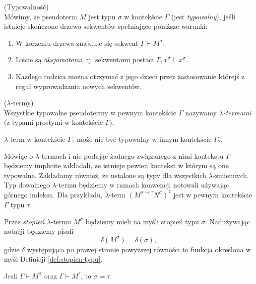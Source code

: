 \begin{definicja}(Typowalność)\\
  Mówimy, że pseudoterm \(M\) jest typu \(\sigma\) w kontekście \(\Gamma\) (jest \emph{typowalny}), jeśli istnieje skończone drzewo sekwentów spełniające poniższe warunki:
  \begin{enumerate}
      \item W korzeniu drzewa znajduje się sekwent \(\Gamma \vdash M^\sigma\).
      \item Liście są \emph{aksjomatami}, tj. sekwentami postaci \(\Gamma, x^\sigma \vdash x^\sigma\).
      \item Każdego rodzica można otrzymać z jego dzieci przez zastosowanie którejś z reguł wyprowadzania nowych sekwentów.
  \end{enumerate}
\end{definicja}
 \begin{definicja}\label{def:lambda-term}(\(\lambda\)-termy)\\ 
   Wszystkie typowalne pseudotermy w pewnym kontekście \(\Gamma\) nazywamy \emph{\(\lambda\)-termami} (z typami prostymi w  kontekście \(\Gamma\)).
  \begin{uwaga*}
    \(\lambda\)-term w kontekście \(\Gamma_1\) może nie być typowalny w innym kontekście \(\Gamma_2\).   
  \end{uwaga*}
\end{definicja}
Mówiąc o \(\lambda\)-termach i nie podając żadnego związanego z nimi kontekstu \(\Gamma\) będziemy implicite zakładali, że istnieje pewien kontekst w którym są one typowalne. Zakładamy również, że ustalone są typy dla wszystkich \(\lambda\)-zmiennych. Typ dowolnego \(\lambda\)-termu będziemy w ramach konwencji notowali używając górnego indeksu. Dla przykładu, \(\lambda\)-term \(\left(M^{\sigma\to\tau}N^\sigma\right)^\tau\) jest w pewnym kontekście \(\Gamma\) typu \(\tau\). 

   Przez \emph{stopień} \(\lambda\)-termu \(M^\sigma\) będziemy mieli na myśli stopień typu \(\sigma\). Nadużywając notacji będziemy pisali
   \[
     \delta(M^\sigma) = \delta(\sigma),
   \]
   gdzie \(\delta\) występująca po prawej stronie powyższej równości to funkcja określona w myśl Definicji \ref{def:stopien-typu}.


  \begin{fakt}
    Jesli \(\Gamma\vdash M^\sigma\) oraz \(\Gamma\vdash M^\tau\), to \(\sigma=\tau\).
  \end{fakt}
